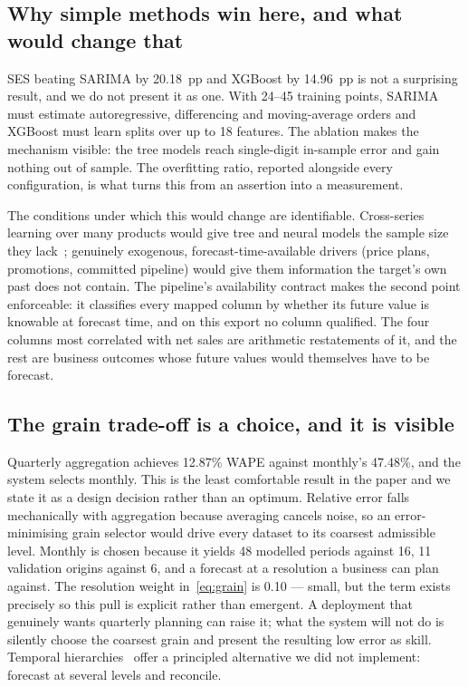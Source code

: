 \documentclass[conference]{IEEEtran}
\begin{document}
\subsection{Why simple methods win here, and what would change that}

SES beating SARIMA by 20.18~pp and XGBoost by 14.96~pp is not a surprising
result, and we do not present it as one. With 24--45 training points, SARIMA
must estimate autoregressive, differencing and moving-average orders and
XGBoost must learn splits over up to 18 features. The ablation makes the
mechanism visible: the tree models reach single-digit in-sample error and gain
nothing out of sample. The overfitting ratio, reported alongside every
configuration, is what turns this from an assertion into a measurement.

The conditions under which this would change are identifiable. Cross-series
learning over many products would give tree and neural models the sample size
they lack~\cite{monteromanso2020fforma,shchur2023autogluon}; genuinely
exogenous, forecast-time-available drivers (price plans, promotions,
committed pipeline) would give them information the target's own past does not
contain. The pipeline's availability contract makes the second point
enforceable: it classifies every mapped column by whether its future value is
knowable at forecast time, and on this export no column qualified. The four
columns most correlated with net sales are arithmetic restatements of it, and
the rest are business outcomes whose future values would themselves have to be
forecast.

\subsection{The grain trade-off is a choice, and it is visible}

Quarterly aggregation achieves 12.87\% WAPE against monthly's 47.48\%, and the
system selects monthly. This is the least comfortable result in the paper and
we state it as a design decision rather than an optimum. Relative error falls
mechanically with aggregation because averaging cancels noise, so an
error-minimising grain selector would drive every dataset to its coarsest
admissible level. Monthly is chosen because it yields 48 modelled periods
against 16, 11 validation origins against 6, and a forecast at a resolution a
business can plan against. The resolution weight in~\eqref{eq:grain} is
0.10 --- small, but the term exists precisely so this pull is explicit rather
than emergent. A deployment that genuinely wants quarterly planning can raise
it; what the system will not do is silently choose the coarsest grain and
present the resulting low error as skill. Temporal
hierarchies~\cite{athanasopoulos2017temporal} offer a principled alternative
we did not implement: forecast at several levels and reconcile.
\end{document}
